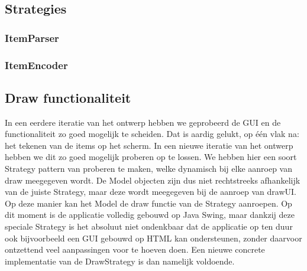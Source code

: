 \documentclass[a4paper]{article}
\newcommand{\1}[0]{\'{e}\'{e}n}
\begin{document}
\subsection{Strategies}
\subsubsection{ItemParser}
\subsubsection{ItemEncoder}

\subsection{Draw functionaliteit}
In een eerdere iteratie van het ontwerp hebben we geprobeerd de GUI en de functionaliteit zo goed mogelijk te scheiden. Dat is aardig gelukt, op \1 vlak na: het tekenen van de items op het scherm. In een nieuwe iteratie van het ontwerp hebben we dit zo goed mogelijk proberen op te lossen. We hebben hier een soort Strategy pattern van proberen te maken, welke dynamisch bij elke aanroep van draw meegegeven wordt. De Model objecten zijn dus niet rechtstreeks afhankelijk van de juiste Strategy, maar deze wordt meegegeven bij de aanroep van drawUI. Op deze manier kan het Model de draw functie van de Strategy aanroepen. Op dit moment is de applicatie volledig gebouwd op Java Swing, maar dankzij deze speciale Strategy is het absoluut niet ondenkbaar dat de applicatie op ten duur ook bijvoorbeeld een GUI gebouwd op HTML kan ondersteunen, zonder daarvoor ontzettend veel aanpassingen voor te hoeven doen. Een nieuwe concrete implementatie van de DrawStrategy is dan namelijk voldoende.
\end{document}
